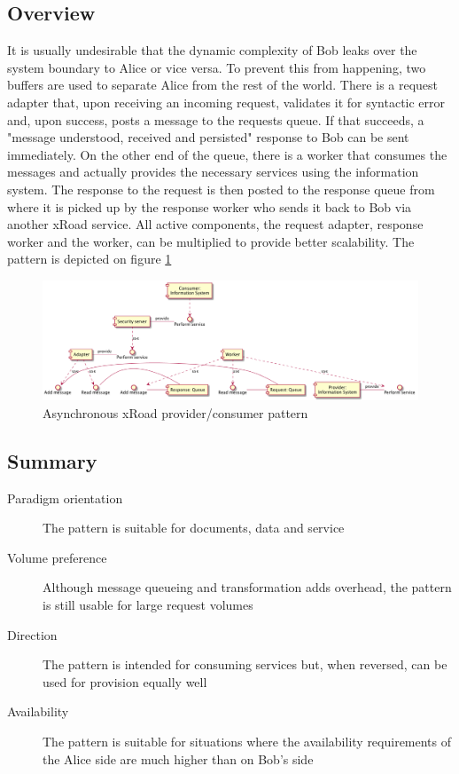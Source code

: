 \documentclass[10pt,a4paper]{article}
\begin{document}
\subsection{Overview}
It is usually undesirable that the dynamic complexity  of Bob leaks over the system boundary to Alice or vice versa. To prevent this from happening, two buffers are used to separate Alice from the rest of the world. There is a request adapter that, upon receiving an incoming request, validates it for syntactic error and, upon success, posts a message to the requests queue. If that succeeds, a "message understood, received and persisted" response to Bob can be sent immediately. On the other end of the queue, there is a worker that consumes the messages and actually provides the necessary services using the information system. The response to the request is then posted to the response queue from where it is picked up by the response worker who sends it back to Bob via another xRoad service. All active components, the request adapter, response worker and the worker, can be multiplied to provide better scalability. The pattern is depicted on figure \ref{fig:p:5}

\begin{figure}[htp]
	\begin{center}
		\includegraphics[width=1\textwidth]{5_comp.png}
		\caption{Asynchronous xRoad provider/consumer pattern}
		\label{fig:p:5}
	\end{center}
\end{figure}

\subsection{Summary}
\begin{description}
	\item[Paradigm orientation] The pattern is suitable for documents, data and service
	\item[Volume preference] Although message queueing and transformation adds overhead, the pattern is still usable for large request volumes
	\item[Direction] The pattern is intended for consuming services but, when reversed, can be used for provision equally well
	\item[Availability] The pattern is suitable for situations where the availability requirements of the Alice side are much higher than on Bob's side
\end{description}
\end{document}
